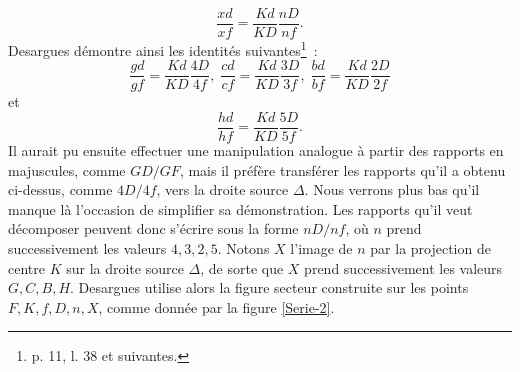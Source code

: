\documentclass[12pt, a4paper]{article}
\begin{document}
\[
\frac{xd}{xf}=\frac{Kd}{KD}\frac{nD}{nf}.
\]
Desargues démontre ainsi les identités suivantes\footnote{p. 11, l. 38 et suivantes.}~:~
\[
\frac{gd}{gf}=\frac{Kd}{KD}\frac{4D}{4f},\;\frac{cd}{cf}=\frac{Kd}{KD}\frac{3D}{3f},\;\frac{bd}{bf}=\frac{Kd}{KD}\frac{2D}{2f}
\]
et
\[
\frac{hd}{hf}=\frac{Kd}{KD}\frac{5D}{5f}.
\]
Il aurait pu ensuite effectuer une manipulation analogue à partir des rapports en majuscules, comme $GD/GF$, mais il préfère transférer les rapports qu'il a obtenu ci-dessus, comme $4D/4f$, vers la droite source $\Delta$. Nous verrons plus bas qu'il manque là l'occasion de simplifier sa démonstration. Les rapports qu'il veut décomposer peuvent donc s'écrire sous la forme $nD/nf$, où $n$ prend successivement les valeurs $4,3,2,5$. Notons $X$ l'image de $n$ par la projection de centre $K$ sur la droite source $\Delta$, de sorte que $X$ prend successivement les valeurs $G,C,B,H$. Desargues utilise alors la figure secteur construite sur les points $F,K,f,D,n,X$, comme donnée par la figure \ref{Serie-2}.
\end{document}
